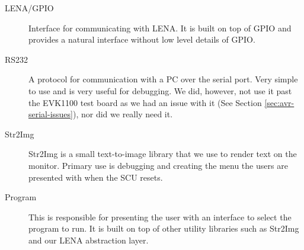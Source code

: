 \begin{description}
\item[LENA/GPIO] Interface for communicating with \ac{LENA}. It is built on
  top of GPIO and provides a natural interface without low level details of GPIO.


\item[RS232] A protocol for communication with a PC over the serial port. Very
  simple to use and is very useful for debugging. We did, however, not use it
  past the EVK1100 test board as we had an issue with it (See Section
  \ref{sec:avr-serial-issues}), nor did we really need it.



\item[Str2Img] Str2Img is a small text-to-image library that we use to render
  text on the monitor. Primary use is debugging and creating the menu the users
  are presented with when the SCU resets.
  
\item[Program] This is responsible for presenting the user with an interface to
  select the program to run. It is built on top of other utility libraries such
  as Str2Img and our \ac{LENA} abstraction layer.



\end{description}

